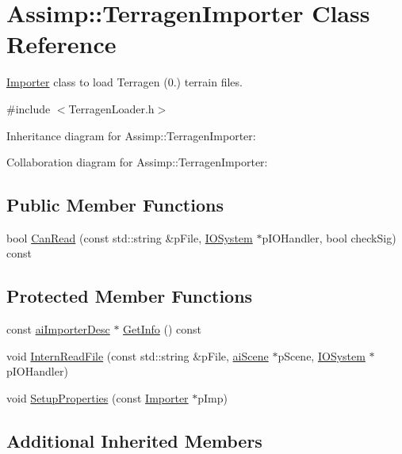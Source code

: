\hypertarget{class_assimp_1_1_terragen_importer}{\section{Assimp\+:\+:Terragen\+Importer Class Reference}
\label{class_assimp_1_1_terragen_importer}
}


\hyperlink{class_assimp_1_1_importer}{Importer} class to load Terragen (0.) terrain files.  




{\ttfamily \#include $<$Terragen\+Loader.\+h$>$}



Inheritance diagram for Assimp\+:\+:Terragen\+Importer\+:


Collaboration diagram for Assimp\+:\+:Terragen\+Importer\+:
\subsection*{Public Member Functions}
\begin{DoxyCompactItemize}
\item 
bool \hyperlink{class_assimp_1_1_terragen_importer_a9ea5a0d8351e2deca867841948ba858e}{Can\+Read} (const std\+::string \&p\+File, \hyperlink{class_assimp_1_1_i_o_system}{I\+O\+System} $\ast$p\+I\+O\+Handler, bool check\+Sig) const 
\end{DoxyCompactItemize}
\subsection*{Protected Member Functions}
\begin{DoxyCompactItemize}
\item 
const \hyperlink{structai_importer_desc}{ai\+Importer\+Desc} $\ast$ \hyperlink{class_assimp_1_1_terragen_importer_a222f315c7d7db5728efc5dc9407c7503}{Get\+Info} () const 
\item 
void \hyperlink{class_assimp_1_1_terragen_importer_a3f645f0881440c057655cd486e88a04a}{Intern\+Read\+File} (const std\+::string \&p\+File, \hyperlink{structai_scene}{ai\+Scene} $\ast$p\+Scene, \hyperlink{class_assimp_1_1_i_o_system}{I\+O\+System} $\ast$p\+I\+O\+Handler)
\item 
void \hyperlink{class_assimp_1_1_terragen_importer_aa625c98a68fa8a2adb3b8c40074057a0}{Setup\+Properties} (const \hyperlink{class_assimp_1_1_importer}{Importer} $\ast$p\+Imp)
\end{DoxyCompactItemize}
\subsection*{Additional Inherited Members}



